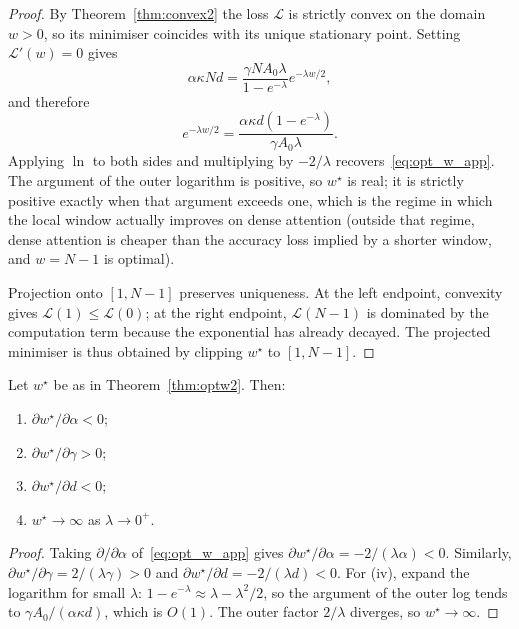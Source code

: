 \begin{proof}
By Theorem~\ref{thm:convex2} the loss $\mathcal{L}$ is strictly
convex on the domain $w > 0$, so its minimiser coincides with
its unique stationary point. Setting $\mathcal{L}'(w) = 0$ gives
\begin{equation}
    \alpha \kappa N d
    = \frac{\gamma N A_0 \lambda}{1 - e^{-\lambda}}
      e^{-\lambda w / 2},
\end{equation}
and therefore
\begin{equation}
    e^{-\lambda w / 2}
    = \frac{\alpha \kappa d (1 - e^{-\lambda})}{\gamma A_0 \lambda}.
\end{equation}
Applying $\ln$ to both sides and multiplying by $-2/\lambda$
recovers~\eqref{eq:opt_w_app}. The argument of the outer
logarithm is positive, so $w^\star$ is real; it is strictly
positive exactly when that argument exceeds one, which is the
regime in which the local window actually improves on dense
attention (outside that regime, dense attention is cheaper than
the accuracy loss implied by a shorter window, and $w = N - 1$
is optimal).

Projection onto $[1, N-1]$ preserves uniqueness. At the left
endpoint, convexity gives $\mathcal{L}(1) \le \mathcal{L}(0)$;
at the right endpoint, $\mathcal{L}(N-1)$ is dominated by the
computation term because the exponential has already decayed.
The projected minimiser is thus obtained by clipping $w^\star$
to $[1, N-1]$.
\end{proof}

\begin{corollary}[Sensitivities]\label{cor:sens}
Let $w^\star$ be as in Theorem~\ref{thm:optw2}. Then:
\begin{enumerate}
    \item[\textup{(i)}] $\partial w^\star / \partial \alpha < 0$;
    \item[\textup{(ii)}] $\partial w^\star / \partial \gamma > 0$;
    \item[\textup{(iii)}] $\partial w^\star / \partial d < 0$;
    \item[\textup{(iv)}] $w^\star \to \infty$ as $\lambda \to 0^+$.
\end{enumerate}
\end{corollary}

\begin{proof}
Taking $\partial / \partial \alpha$
of~\eqref{eq:opt_w_app} gives
$\partial w^\star / \partial \alpha = -2/(\lambda \alpha) < 0$.
Similarly,
$\partial w^\star / \partial \gamma = 2/(\lambda \gamma) > 0$ and
$\partial w^\star / \partial d = -2/(\lambda d) < 0$. For (iv), expand
the logarithm for small $\lambda$: $1 - e^{-\lambda}
\approx \lambda - \lambda^2/2$, so the argument of the outer log tends
to $\gamma A_0 / (\alpha \kappa d)$, which is $O(1)$. The outer factor
$2/\lambda$ diverges, so $w^\star \to \infty$.
\end{proof}

